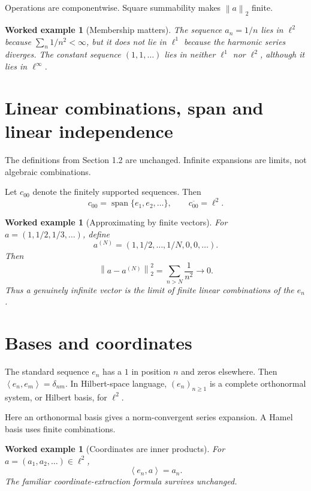 \documentclass[11pt,a5paper,oneside,openany]{scrreprt}
\theoremstyle{notes}
\theoremstyle{definitions}
\newtheorem{example}[theorem]{Worked example}
\newcommand{\ip}[2]{\left\langle #1,#2\right\rangle}
\newcommand{\norm}[1]{\left\lVert #1\right\rVert}
\newcommand{\Span}{\operatorname{span}}
\begin{document}
Operations are componentwise.  Square summability makes $\norm{a}_2$ finite.

\begin{example}[Membership matters]
The sequence $a_n=1/n$ lies in $\ell^2$ because
$\sum_n1/n^2<\infty$, but it does not lie in $\ell^1$ because the harmonic
series diverges.  The constant sequence $(1,1,\ldots)$ lies in neither
$\ell^1$ nor $\ell^2$, although it lies in $\ell^\infty$.
\end{example}

\section{Linear combinations, span and linear independence}

The definitions from Section 1.2 are unchanged.  Infinite expansions are
limits, not algebraic combinations.

Let $c_{00}$ denote the finitely supported sequences.  Then
\[
 c_{00}=\Span\{e_1,e_2,\ldots\},
 \qquad \overline{c_{00}}=\ell^2.
\]

\begin{example}[Approximating by finite vectors]
For $a=(1,1/2,1/3,\ldots)$, define
\[
 a^{(N)}=(1,1/2,\ldots,1/N,0,0,\ldots).
\]
Then
\[
 \norm{a-a^{(N)}}_2^2=\sum_{n>N}\frac1{n^2}\longrightarrow0.
\]
Thus a genuinely infinite vector is the limit of finite linear combinations
of the $e_n$.
\end{example}

\section{Bases and coordinates}

The standard sequence $e_n$ has a $1$ in position $n$ and zeros elsewhere.
Then $\ip{e_n}{e_m}=\delta_{nm}$.  In Hilbert-space language,
$(e_n)_{n\ge1}$ is a complete orthonormal system, or Hilbert basis, for
$\ell^2$.

\begin{caution}
Here an orthonormal basis gives a norm-convergent series expansion.
A Hamel basis uses finite combinations.
\end{caution}

\begin{example}[Coordinates are inner products]
For $a=(a_1,a_2,\ldots)\in\ell^2$,
\[
  \ip{e_n}{a}=a_n.
\]
The familiar coordinate-extraction formula survives unchanged.
\end{example}
\end{document}
